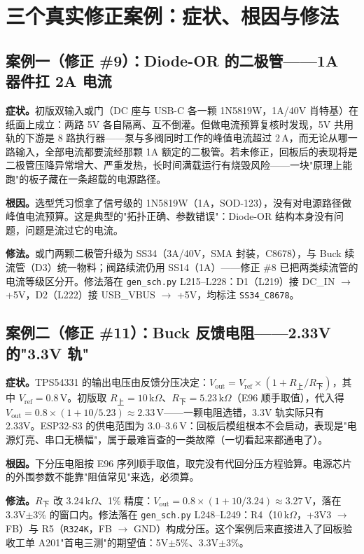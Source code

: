 \section{三个真实修正案例：症状、根因与修法}
\label{sec:sch-cases}

\subsection{案例一（修正 \#9）：Diode-OR 的二极管——1A 器件扛 2A 电流}
\label{sec:sch-case9}

\textbf{症状。}初版双输入或门（DC 座与 USB-C 各一颗 1N5819W，1A/40V 肖特基）在纸面上成立：两路 5V 各自隔离、互不倒灌。但做电流预算复核时发现，5V 共用轨的下游是 8 路执行器——泵与多阀同时工作的峰值电流超过 2\,A，而无论从哪一路输入，全部电流都要流经那颗 1A 额定的二极管。若未修正，回板后的表现将是二极管压降异常增大、严重发热，长时间满载运行有烧毁风险——一块"原理上能跑"的板子藏在一条超载的电源路径。

\textbf{根因。}选型凭习惯拿了信号级的 1N5819W（1A，SOD-123），没有对电源路径做峰值电流预算。这是典型的"拓扑正确、参数错误"：Diode-OR 结构本身没有问题，问题是流过它的电流。

\textbf{修法。}或门两颗二极管升级为 SS34（3A/40V，SMA 封装，C8678），与 Buck 续流管（D3）统一物料；阀路续流仍用 SS14（1A）——修正 \#8 已把两类续流管的电流等级区分开。修法落在 \texttt{gen\_sch.py} L215--L228：D1（L219）接 DC\_IN $\to$ +5V，D2（L222）接 USB\_VBUS $\to$ +5V，均标注 \texttt{SS34\_C8678}。

\subsection{案例二（修正 \#11）：Buck 反馈电阻——2.33V 的"3.3V 轨"}
\label{sec:sch-case11}

\textbf{症状。}TPS54331 的输出电压由反馈分压决定：$V_\text{out} = V_\text{ref}\times(1+R_\text{上}/R_\text{下})$，其中 $V_\text{ref}=0.8$\,V。初版取 $R_\text{上}=10$\,k$\Omega$、$R_\text{下}=5.23$\,k$\Omega$（E96 顺手取值），代入得 $V_\text{out}=0.8\times(1+10/5.23)\approx2.33$\,V——一颗电阻选错，3.3V 轨实际只有 2.33V。ESP32-S3 的供电范围为 3.0--3.6\,V：回板后模组根本不会启动，表现是"电源灯亮、串口无横幅"，属于最难盲查的一类故障（一切看起来都通电了）。

\textbf{根因。}下分压电阻按 E96 序列顺手取值，取完没有代回分压方程验算。电源芯片的外围参数不能靠"阻值常见"来选，必须算。

\textbf{修法。}$R_\text{下}$ 改 3.24\,k$\Omega$、1\% 精度：$V_\text{out}=0.8\times(1+10/3.24)\approx3.27$\,V，落在 3.3V$\pm$3\% 的窗口内。修法落在 \texttt{gen\_sch.py} L248--L249：R4（10\,k$\Omega$，+3V3 $\to$ FB）与 R5（\texttt{R324K}，FB $\to$ GND）构成分压。这个案例后来直接进入了回板验收工单 A201"首电三测"的期望值：5V$\pm$5\%、3.3V$\pm$3\%。

